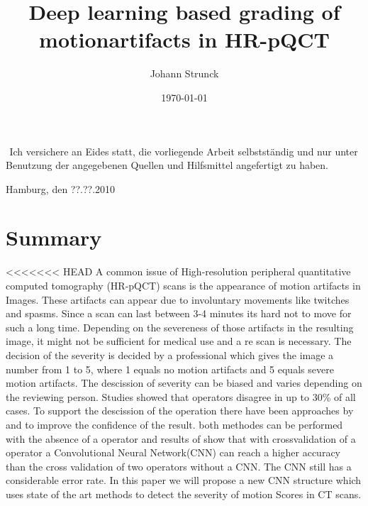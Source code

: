 \documentclass[
a4paper, 
12pt,
grayscalebody, %
abstract=on,
twoside, BCOR10mm, 12pt, DIV13,headinclude, footexclude, final, abstracton, openright
]{ibireprt}
\author{Johann Strunck}
\title{Deep learning based grading of motionartifacts in HR-pQCT}
\date{\today}
\numberwithin{equation}{chapter}
\numberwithin{table}{chapter}
\numberwithin{figure}{chapter}
\numberwithin{algorithm}{chapter}
\numberwithin{example}{chapter}
\numberwithin{example}{chapter}
\begin{document}
\maketitle


\newpage
${}^{}$
\vfill
\noindent
Ich versichere an Eides statt, die vorliegende Arbeit selbstständig und nur unter Benutzung der angegebenen Quellen und Hilfsmittel angefertigt zu haben.\\
\vspace{1.5cm}

\noindent
Hamburg, den ??.??.2010
\thispagestyle{empty}
\newpage
\newpage

\setlength{\parskip}{1.5mm }





\tableofcontents


\chapter*{Summary}
<<<<<<< HEAD
	A common issue of High-resolution peripheral quantitative computed tomography (HR-pQCT) scans is the appearance of motion artifacts in Images. These artifacts can appear due to involuntary movements like twitches and spasms. Since a scan can last between 3-4 minutes its hard not to move for such a long time. Depending on the severeness of those artifacts in the resulting image, it might not be sufficient for medical use and a re scan is necessary. The decision of the severity is decided by a professional which gives the image a number from 1 to 5, where 1 equals no motion artifacts and 5 equals severe motion artifacts. The descission of severity can be biased and varies depending on the reviewing person. Studies showed that operators disagree in up to 30\% of all cases.
	 To support the descission of the operation there have been approaches by \cite{Sode2011} and \cite{Walle2023}  to improve the confidence of the result. both methodes can be performed with the absence of a operator and results of \cite{Sode2011} show that with crossvalidation of a operator  a Convolutional Neural Network(CNN) can reach a higher accuracy than the cross validation of two operators without a CNN. The CNN still has a considerable error rate. In this paper we will propose a new CNN structure which uses state of the art methods to detect the severity of motion Scores in CT scans. 
\end{document}

